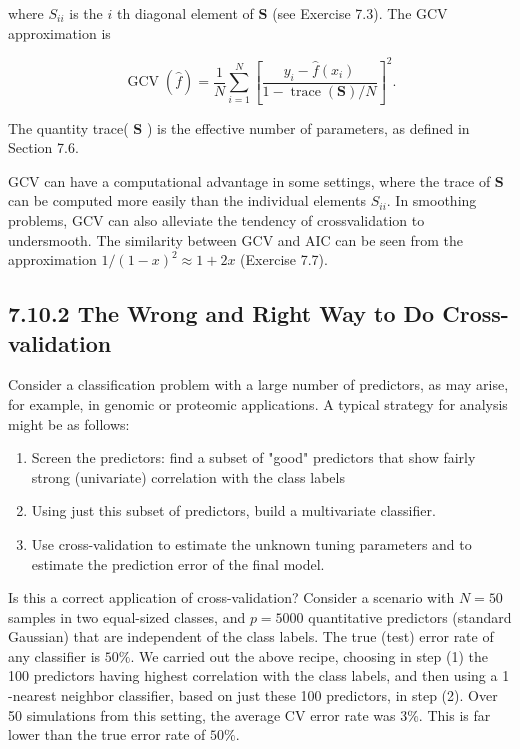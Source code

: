 \documentclass[10pt]{article}
\begin{document}
where $S_{i i}$ is the $i$ th diagonal element of $\mathbf{S}$ (see Exercise 7.3). The GCV approximation is


\begin{equation*}
\operatorname{GCV}(\hat{f})=\frac{1}{N} \sum_{i=1}^{N}\left[\frac{y_{i}-\hat{f}\left(x_{i}\right)}{1-\operatorname{trace}(\mathbf{S}) / N}\right]^{2} . \tag{7.52}
\end{equation*}


The quantity trace( $\mathbf{S}$ ) is the effective number of parameters, as defined in Section 7.6.

GCV can have a computational advantage in some settings, where the trace of $\mathbf{S}$ can be computed more easily than the individual elements $S_{i i}$. In smoothing problems, GCV can also alleviate the tendency of crossvalidation to undersmooth. The similarity between GCV and AIC can be seen from the approximation $1 /(1-x)^{2} \approx 1+2 x$ (Exercise 7.7).

\subsection*{7.10.2 The Wrong and Right Way to Do Cross-validation}
Consider a classification problem with a large number of predictors, as may arise, for example, in genomic or proteomic applications. A typical strategy for analysis might be as follows:

\begin{enumerate}
  \item Screen the predictors: find a subset of "good" predictors that show fairly strong (univariate) correlation with the class labels
  \item Using just this subset of predictors, build a multivariate classifier.
  \item Use cross-validation to estimate the unknown tuning parameters and to estimate the prediction error of the final model.
\end{enumerate}

Is this a correct application of cross-validation? Consider a scenario with $N=50$ samples in two equal-sized classes, and $p=5000$ quantitative predictors (standard Gaussian) that are independent of the class labels. The true (test) error rate of any classifier is $50 \%$. We carried out the above recipe, choosing in step (1) the 100 predictors having highest correlation with the class labels, and then using a 1 -nearest neighbor classifier, based on just these 100 predictors, in step (2). Over 50 simulations from this setting, the average CV error rate was $3 \%$. This is far lower than the true error rate of $50 \%$.
\end{document}
